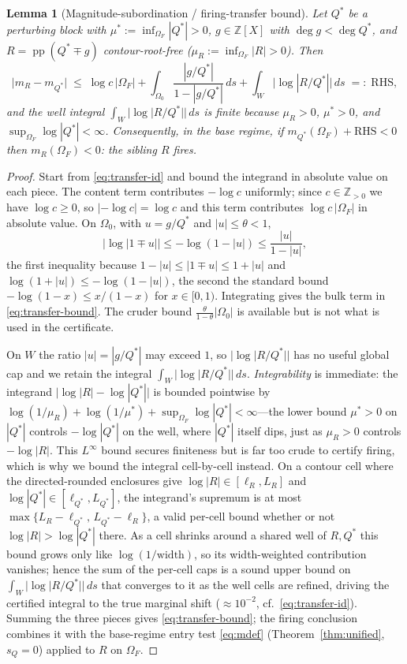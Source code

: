 \documentclass[11pt,reqno]{amsart}
\theoremstyle{plain}
\newtheorem{lemma}[theorem]{Lemma}
\theoremstyle{definition}
\theoremstyle{remark}
\newcommand{\Z}{\mathbb{Z}}
\DeclareMathOperator{\pp}{pp}
\begin{document}
\begin{lemma}[Magnitude-subordination / firing-transfer bound]\label{lem:transfer}
Let $Q^*$ be a perturbing block with $\mu^*:=\inf_{\Omega_F}|Q^*|>0$, $g\in\Z[X]$ with
$\deg g<\deg Q^*$, and $R=\pp(Q^*\mp g)$ contour-root-free
($\mu_R:=\inf_{\Omega_F}|R|>0$). Then
\begin{equation}\label{eq:transfer-bound}
  \bigl|m_R-m_{Q^*}\bigr|
  \;\le\;\log c\,|\Omega_F|
  +\int_{\Omega_0}\frac{|g/Q^*|}{1-|g/Q^*|}\,ds
  +\int_{W}\bigl|\log|R/Q^*|\bigr|\,ds\;=:\;\mathrm{RHS},
\end{equation}
and the well integral $\int_{W}|\log|R/Q^*||\,ds$ is finite because $\mu_R>0$, $\mu^*>0$,
and $\sup_{\Omega_F}\log|Q^*|<\infty$. Consequently, in the base regime, if
$m_{Q^*}(\Omega_F)+\mathrm{RHS}<0$ then $m_R(\Omega_F)<0$: the sibling $R$ fires.
\end{lemma}

\begin{proof}
Start from \eqref{eq:transfer-id} and bound the integrand in absolute value on each
piece. The content term contributes $-\log c$ uniformly; since $c\in\Z_{>0}$ we have
$\log c\ge0$, so $|{-}\log c|=\log c$ and this term contributes $\log c\,|\Omega_F|$ in
absolute value. On $\Omega_0$, with $u=g/Q^*$ and $|u|\le\theta<1$,
\[
  \bigl|\log|1\mp u|\bigr|\le-\log(1-|u|)\le\frac{|u|}{1-|u|},
\]
the first inequality because $1-|u|\le|1\mp u|\le 1+|u|$ and
$\log(1+|u|)\le-\log(1-|u|)$, the second the standard bound
$-\log(1-x)\le x/(1-x)$ for $x\in[0,1)$. Integrating gives the bulk term in
\eqref{eq:transfer-bound}.  The cruder bound
$\frac{\theta}{1-\theta}|\Omega_0|$ is available but is not what is used in the
certificate.

On $W$ the ratio $|u|=|g/Q^*|$ may exceed $1$, so $|\log|R/Q^*||$ has no useful global
cap and we retain the integral $\int_W|\log|R/Q^*||\,ds$. \emph{Integrability} is
immediate: the integrand $\bigl|\log|R|-\log|Q^*|\bigr|$ is bounded pointwise by
$\log(1/\mu_R)+\log(1/\mu^*)+\sup_{\Omega_F}\log|Q^*|<\infty$---the lower bound
$\mu^*>0$ on $|Q^*|$ controls $-\log|Q^*|$ on the well, where $|Q^*|$ itself dips, just
as $\mu_R>0$ controls $-\log|R|$. This $L^\infty$
bound secures finiteness but is far too crude to certify firing, which is why we bound
the integral cell-by-cell instead. On a contour cell where the directed-rounded
enclosures give $\log|R|\in[\ell_R,L_R]$ and $\log|Q^*|\in[\ell_{Q^*},L_{Q^*}]$, the
integrand's supremum is at most $\max\{L_R-\ell_{Q^*},\,L_{Q^*}-\ell_R\}$, a valid
per-cell bound whether or not $\log|R|>\log|Q^*|$ there. As a cell shrinks around a
shared well of $R,Q^*$ this bound grows only like $\log(1/\text{width})$, so its
width-weighted contribution vanishes; hence the sum of the per-cell caps is a sound
upper bound on $\int_W|\log|R/Q^*||\,ds$ that converges to it as the well cells are
refined, driving the certified integral to the true marginal shift ($\approx10^{-2}$,
cf.\ \eqref{eq:transfer-id}).
Summing the three pieces gives \eqref{eq:transfer-bound}; the firing conclusion combines
it with the base-regime entry test \eqref{eq:mdef} (Theorem~\ref{thm:unified}, $s_Q=0$)
applied to $R$ on $\Omega_F$.
\end{proof}
\end{document}

